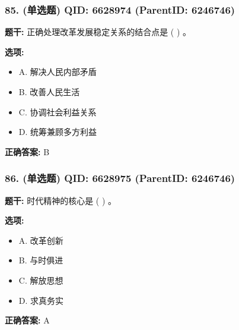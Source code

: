 \documentclass[12pt,UTF8]{ctexart}
\begin{document}
\vspace{0.3em}\hrulefill\vspace{0.7em}

\subsubsection*{85. (单选题) \small QID: 6628974 (ParentID: 6246746)}

\textbf{题干:}
正确处理改革发展稳定关系的结合点是  ( )  。



\textbf{选项:}
\begin{itemize}[leftmargin=*]

  \item A. 解决人民内部矛盾

  \item B. 改善人民生活

  \item C. 协调社会利益关系

  \item D. 统筹兼顾多方利益

\end{itemize}

\textbf{正确答案:}
B

\vspace{0.3em}\hrulefill\vspace{0.7em}

\subsubsection*{86. (单选题) \small QID: 6628975 (ParentID: 6246746)}

\textbf{题干:}
时代精神的核心是  ( )  。



\textbf{选项:}
\begin{itemize}[leftmargin=*]

  \item A. 改革创新

  \item B. 与时俱进

  \item C. 解放思想

  \item D. 求真务实

\end{itemize}

\textbf{正确答案:}
A

\vspace{0.3em}\hrulefill\vspace{0.7em}
\end{document}
